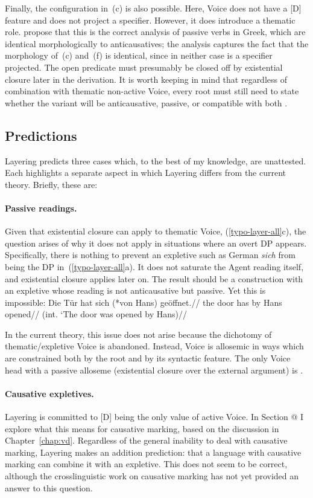 Finally, the configuration in~(\lastx c) is also possible. Here, Voice does not have a [D] feature and does not project a specifier. However, it does introduce a thematic role. \cite{layering15} propose that this is the correct analysis of passive verbs in Greek, which are identical morphologically to anticausatives; the analysis captures the fact that the morphology of~(\lastx c) and~(\lastx f) is identical, since in neither case is a specifier projected. The open predicate must presumably be closed off by existential closure later in the derivation. It is worth keeping in mind that regardless of combination with thematic non-active Voice, every root must still need to state whether the  variant will be anticausative, passive, or compatible with both \citep[88]{alexiadouanagnostopoulou04,layering15}.


	\subsection{Predictions}
Layering predicts three cases which, to the best of my knowledge, are unattested. Each highlights a separate aspect in which Layering differs from the current theory. Briefly, these are:

\paragraph*{Passive readings.} Given that existential closure can apply to thematic Voice, (\ref{typo-layer-all}c), the question arises of why it does not apply in situations where an overt DP appears. Specifically, there is nothing to prevent an expletive such as German \emph{sich} from being the DP in~(\ref{typo-layer-all}a). It does not saturate the Agent reading itself, and existential closure applies later on. The result should be a construction with an expletive whose reading is not anticausative but passive. Yet this is impossible:
\ex \begingl
	\gla Die T\"ur hat sich (*von Hans) ge\"offnet.//
	\glb the door has  by Hans opened//
	\glft (int. `The door was opened by Hans)//
	\endgl
\xe

In the current theory, this issue does not arise because the dichotomy of thematic/expletive Voice is abandoned. Instead, Voice is allosemic in ways which are constrained both by the root and by its syntactic feature. The only Voice head with a passive alloseme (existential closure over the external argument) is {\vz}.

\paragraph*{Causative expletives.} Layering is committed to [D] being the only value of active Voice. In Section @ I explore what this means for causative marking, based on the discussion in Chapter~\ref{chap:vd}. Regardless of the general inability to deal with causative marking, Layering makes an addition prediction: that a language with causative marking can combine it with an expletive. This does not seem to be correct, although the crosslinguistic work on causative marking has not yet provided an answer to this question.

